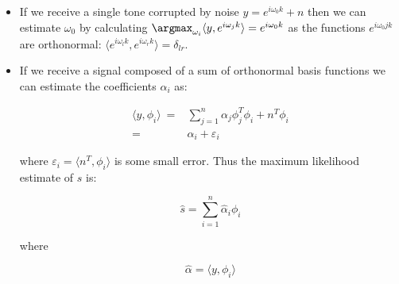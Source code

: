 \begin{itemize}
\item If we receive a single tone corrupted by noise \(y = e^{i \omega_0 k} + n\) then we can estimate \(\omega_0\) by calculating \(\argmax_{\omega_i} \langle y, e^{i \omega_j k}\rangle = e^{i \omega_0 k}\) as the functions \(e^{i \omega_0 j k }\) are orthonormal: \(\langle e^{i \omega_l k}, e^{i \omega_r k} \rangle = \delta_{lr}\).

\item If we receive a signal composed of a sum of orthonormal basis functions we can estimate the coefficients \(\alpha_i\) as:

\begin{align}
\langle y, \phi_i\rangle\ =& \sum_{j=1}^n \alpha_j \phi_j^T\phi_i + n^T\phi_i \\
=& \alpha_i + \varepsilon_i
\end{align}

where \(\varepsilon_i = \langle n^T, \phi_i \rangle \) is some small error. Thus the maximum likelihood estimate of \(s\) is:

\begin{equation}
\hat{s} = \sum_{i=1}^n \hat{\alpha}_i \phi_i
\end{equation}

where

\begin{equation}
\hat{\alpha} = \langle y, \phi_i \rangle
\end{equation}

\end{itemize}